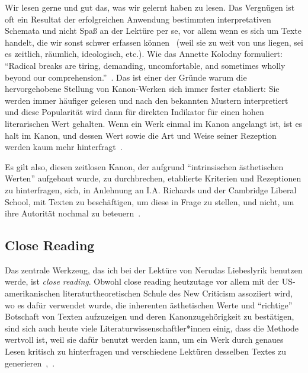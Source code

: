 Wir lesen gerne und gut das, was wir gelernt haben zu lesen.
Das Vergnügen ist oft ein Resultat der erfolgreichen Anwendung bestimmten interpretativen Schemata und nicht Spaß an der Lektüre per se, vor allem wenn es sich um Texte handelt, die wir sonst schwer erfassen können~\cite{Kolodny1980} (weil sie zu weit von uns liegen, sei es zeitlich, räumlich, ideologisch, etc.).
Wie das Annette Kolodny formuliert:
``Radical breaks are tiring, demanding, uncomfortable, and sometimes wholly beyond our comprehension.''~\cite{Kolodny1980}.
Das ist einer der Gründe warum die hervorgehobene Stellung von Kanon-Werken sich immer fester etabliert:
Sie werden immer häufiger gelesen und nach den bekannten Mustern interpretiert und diese Popularität wird dann für direkten Indikator für einen hohen literarischen Wert gehalten.
Wenn ein Werk einmal im Kanon angelangt ist, ist es halt im Kanon, und dessen Wert sowie die Art und Weise seiner Rezeption werden kaum mehr hinterfragt~\cite{Kolodny1980}.

Es gilt also, diesen zeitlosen Kanon, der aufgrund ``intrinsischen ästhetischen Werten'' aufgebaut wurde, zu durchbrechen, etablierte Kriterien und Rezeptionen zu hinterfragen, %
sich, in Anlehnung an I.A. Richards und der Cambridge Liberal School, mit Texten zu beschäftigen, um diese in Frage zu stellen, und nicht, um ihre Autorität nochmal zu beteuern~\cite{North2013}.

\begin{comment}
Worüber geschrieben wird und welche Schrifte überliefert werden, prägt auch welche Themen als wichtig angesehen werden.
Was wiederum maßgeblich durch vorherrschende Machtverhältnisse geprägt wird.
\end{comment}


\subsection{Close Reading}

Das zentrale Werkzeug, das ich bei der Lektüre von Nerudas Liebeslyrik benutzen werde, ist \textit{close reading}.
Obwohl close reading heutzutage vor allem mit der US-amerikanischen literaturtheoretischen Schule des New Criticism assoziiert wird, wo es dafür verwendet wurde, die inherenten ästhetischen Werte und ``richtige'' Botschaft von Texten aufzuzeigen und deren Kanonzugehörigkeit zu bestätigen, sind sich auch heute viele Literaturwissenschaftler*innen einig, dass die Methode wertvoll ist, weil sie dafür benutzt werden kann, um ein Werk durch genaues Lesen kritisch zu hinterfragen und verschiedene Lektüren desselben Textes zu generieren~\cite{Gallop2007},~\cite{Beehler1988}.


